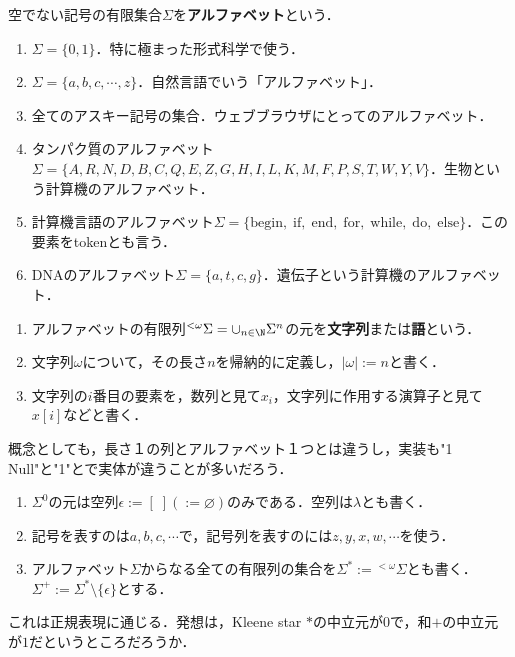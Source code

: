 \begin{definition}[alphabet]
    空でない記号の有限集合$\Sigma$を\textbf{アルファベット}という．
\end{definition}
\begin{example}[アルファベットの例]\mbox{}
    \begin{enumerate}
        \item $\Sigma=\{0,1\}$．特に極まった形式科学で使う．
        \item $\Sigma=\{a,b,c,\cdots,z\}$．自然言語でいう「アルファベット」．
        \item 全てのアスキー記号の集合．ウェブブラウザにとってのアルファベット．
        \item タンパク質のアルファベット$\Sigma=\{A,R,N,D,B,C,Q,E,Z,G,H,I,L,K,M,F,P,S,T,W,Y,V\}$．生物という計算機のアルファベット．
        \item 計算機言語のアルファベット$\Sigma=\{\mathrm{begin,\;if,\;end,\;for,\;while,\;do,\;else}\}$．この要素をtokenとも言う．
        \item DNAのアルファベット$\Sigma=\{a,t,c,g\}$．遺伝子という計算機のアルファベット．
    \end{enumerate}
\end{example}

\begin{definition}\mbox{}
    \begin{enumerate}
        \item アルファベットの有限列${}^{<\omega}\Sigma=\cup_{n\in\N}\Sigma^n$の元を\textbf{文字列}または\textbf{語}という．
        \item 文字列$\omega$について，その長さ$n$を帰納的に定義し，$|\omega|:=n$と書く．
        \item 文字列の$i$番目の要素を，数列と見て$x_i$，文字列に作用する演算子と見て$x[i]$などと書く．
    \end{enumerate}
\end{definition}
\begin{remark}
    概念としても，長さ１の列とアルファベット１つとは違うし，実装も"1 Null"と"1"とで実体が違うことが多いだろう．
\end{remark}
\begin{notation}\mbox{}
    \begin{enumerate}
        \item $\Sigma^0$の元は空列$\epsilon:=[\;](:=\varnothing)$のみである．空列は$\lambda$とも書く．
        \item 記号を表すのは$a,b,c,\cdots$で，記号列を表すのには$z,y,x,w,\cdots$を使う．
        \item アルファベット$\Sigma$からなる全ての有限列の集合を$\Sigma^*:={}^{<\omega}\Sigma$とも書く．
        $\Sigma^+:=\Sigma^*\setminus\{\epsilon\}$とする．
    \end{enumerate}
    これは正規表現に通じる．発想は，Kleene star $*$の中立元が$0$で，和$+$の中立元が$1$だというところだろうか．
\end{notation}

